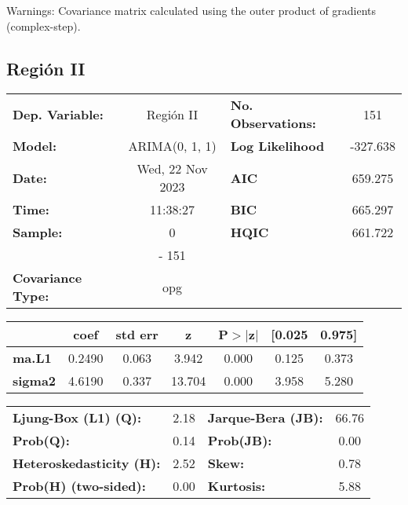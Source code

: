 \documentclass{article}%
\begin{document}
Warnings: \newline
 [1] Covariance matrix calculated using the outer product of gradients (complex-step).%
\subsection*{Región II}%
\begin{center}
\begin{tabular}{lclc}
\toprule
\textbf{Dep. Variable:}          &    Región II     & \textbf{  No. Observations:  } &    151      \\
\textbf{Model:}                  &  ARIMA(0, 1, 1)  & \textbf{  Log Likelihood     } &  -327.638   \\
\textbf{Date:}                   & Wed, 22 Nov 2023 & \textbf{  AIC                } &  659.275    \\
\textbf{Time:}                   &     11:38:27     & \textbf{  BIC                } &  665.297    \\
\textbf{Sample:}                 &        0         & \textbf{  HQIC               } &  661.722    \\
\textbf{}                        &       - 151      & \textbf{                     } &             \\
\textbf{Covariance Type:}        &       opg        & \textbf{                     } &             \\
\bottomrule
\end{tabular}
\begin{tabular}{lcccccc}
                & \textbf{coef} & \textbf{std err} & \textbf{z} & \textbf{P$> |$z$|$} & \textbf{[0.025} & \textbf{0.975]}  \\
\midrule
\textbf{ma.L1}  &       0.2490  &        0.063     &     3.942  &         0.000        &        0.125    &        0.373     \\
\textbf{sigma2} &       4.6190  &        0.337     &    13.704  &         0.000        &        3.958    &        5.280     \\
\bottomrule
\end{tabular}
\begin{tabular}{lclc}
\textbf{Ljung-Box (L1) (Q):}     & 2.18 & \textbf{  Jarque-Bera (JB):  } & 66.76  \\
\textbf{Prob(Q):}                & 0.14 & \textbf{  Prob(JB):          } &  0.00  \\
\textbf{Heteroskedasticity (H):} & 2.52 & \textbf{  Skew:              } &  0.78  \\
\textbf{Prob(H) (two-sided):}    & 0.00 & \textbf{  Kurtosis:          } &  5.88  \\
\bottomrule
\end{tabular}
\end{center}
\end{document}
